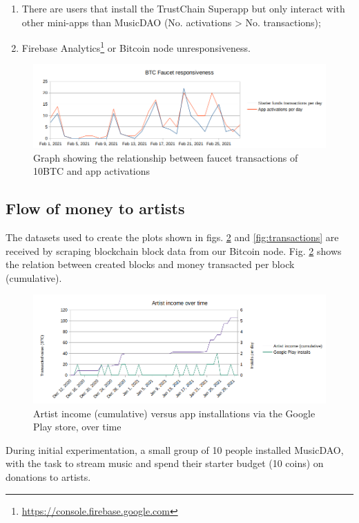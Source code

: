 \begin{enumerate}
    \item There are users that install the TrustChain Superapp but only interact with other mini-apps than MusicDAO (No. activations > No. transactions);
    \item Firebase Analytics\footnote{\url{https://console.firebase.google.com}} or Bitcoin node unresponsiveness.
\end{enumerate}

\begin{figure}
    \centering
    \includegraphics[width=1\textwidth]{evaluation/faucet-app-installs-3.png}
    \caption{Graph showing the relationship between faucet transactions of 10BTC and app activations}
    \label{fig:faucet-app-installs}
\end{figure}

\subsection{Flow of money to artists}
The datasets used to create the plots shown in figs. \ref{fig:artist-income} and \ref{fig:transactions} are received by scraping blockchain block data from our Bitcoin node. Fig. \ref{fig:artist-income} shows the relation between created blocks and money transacted per block (cumulative).

\begin{figure}
    \centering
    \includegraphics[width=1\textwidth]{evaluation/artist-income-3.png}
    \caption{Artist income (cumulative) versus app installations via the Google Play store, over time}
    \label{fig:artist-income}
\end{figure}
During initial experimentation, a small group of 10 people installed MusicDAO, with the task to stream music and spend their starter budget (10 coins) on donations to artists.

